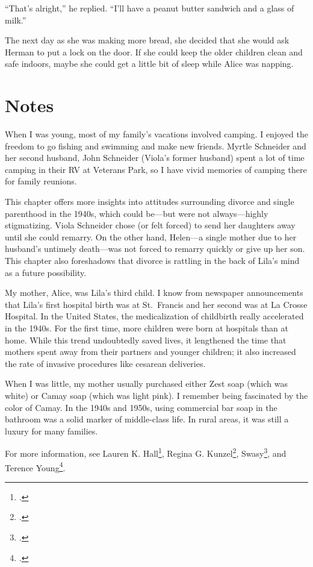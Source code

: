\documentclass[
  letterpaper,
]{book}
\begin{document}
``That's alright,'' he replied. ``I'll have a peanut butter sandwich and
a glass of milk.''

The next day as she was making more bread, she decided that she would
ask Herman to put a lock on the door. If she could keep the older
children clean and safe indoors, maybe she could get a little bit of
sleep while Alice was napping.

\section{Notes}\label{notes-42}

When I was young, most of my family's vacations involved camping. I
enjoyed the freedom to go fishing and swimming and make new friends.
Myrtle Schneider and her second husband, John Schneider (Viola's former
husband) spent a lot of time camping in their RV at Veterans Park, so I
have vivid memories of camping there for family reunions.

This chapter offers more insights into attitudes surrounding divorce and
single parenthood in the 1940s, which could be---but were not
always---highly stigmatizing. Viola Schneider chose (or felt forced) to
send her daughters away until she could remarry. On the other hand,
Helen---a single mother due to her husband's untimely death---was not
forced to remarry quickly or give up her son. This chapter also
foreshadows that divorce is rattling in the back of Lila's mind as a
future possibility.

My mother, Alice, was Lila's third child. I know from newspaper
announcements that Lila's first hospital birth was at St.~Francis and
her second was at La Crosse Hospital. In the United States, the
medicalization of childbirth really accelerated in the 1940s. For the
first time, more children were born at hospitals than at home. While
this trend undoubtedly saved lives, it lengthened the time that mothers
spent away from their partners and younger children; it also increased
the rate of invasive procedures like cesarean deliveries.

When I was little, my mother usually purchased either Zest soap (which
was white) or Camay soap (which was light pink). I remember being
fascinated by the color of Camay. In the 1940s and 1950s, using
commercial bar soap in the bathroom was a solid marker of middle-class
life. In rural areas, it was still a luxury for many families.

For more information, see Lauren K. Hall\footnote{.}, Regina G. Kunzel\footnote{.}, Swasy\footnote{.}, and Terence Young\footnote{.}.
\end{document}
